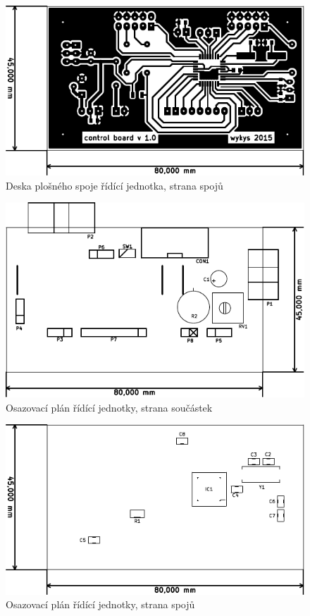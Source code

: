 \begin{figure}[H]
	\centering
	\includegraphics[width=170mm]{img/cu/cu_b.pdf}
	\caption{Deska plošného spoje řídící jednotka, strana spojů}    		
\end{figure}

\begin{figure}[H]
	\centering
	\includegraphics[width=170mm]{img/cu/os_f.pdf}
	\caption{Osazovací plán řídící jednotky, strana součástek}    		
\end{figure}

\begin{figure}[H]
	\centering
	\includegraphics[width=170mm]{img/cu/os_b.pdf}
	\caption{Osazovací plán řídící jednotky, strana spojů}    		
\end{figure}

